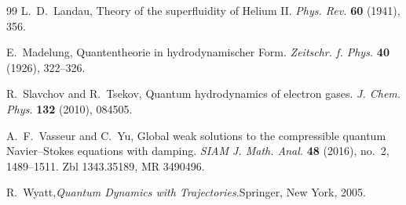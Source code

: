 \documentclass[11pt]{article}
\begin{document}
\begin{thebibliography}{99}
L.~D.~Landau,
\newblock Theory of the superfluidity of Helium II.
\newblock \emph{Phys. Rev.} \textbf{60} (1941), 356.


E.~Madelung,
\newblock Quantentheorie in hydrodynamischer Form.
\newblock \emph{Zeitschr. f. Phys.} \textbf{40} (1926), 322--326.

R.~Slavchov and R.~Tsekov,
\newblock Quantum hydrodynamics of electron gases.
\newblock \emph{J. Chem. Phys.} \textbf{132} (2010), 084505.

A.~F.~Vasseur and C.~Yu,
\newblock Global weak solutions to the compressible quantum Navier--Stokes equations with damping.
\newblock \emph{SIAM J. Math. Anal.} \textbf{48} (2016), no.~2, 1489--1511.
\newblock Zbl 1343.35189, MR 3490496.

R.~Wyatt,\newblock \emph{Quantum Dynamics with Trajectories}.\newblock Springer, New York, 2005.

\end{thebibliography}
\end{document}
